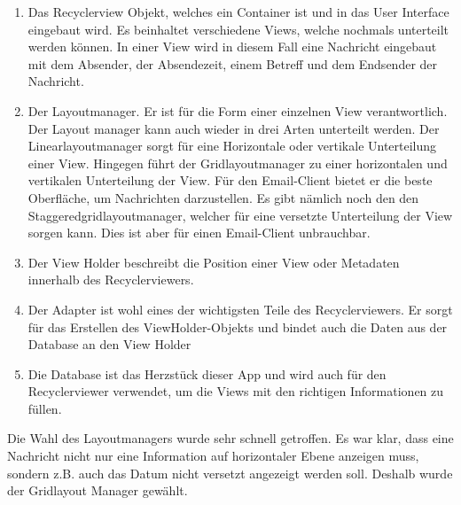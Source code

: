 \documentclass[a4paper,11pt]{article}
\begin{document}
\begin{enumerate}

    \item Das Recyclerview Objekt, welches ein Container ist und in das User Interface eingebaut wird. 
Es beinhaltet verschiedene Views, welche nochmals unterteilt werden können. In einer View wird in diesem 
Fall eine Nachricht eingebaut mit dem Absender, der Absendezeit, einem Betreff und dem Endsender der Nachricht. 

\end{enumerate}

\begin{enumerate}

    \setcounter{enumi}{1}
    \item Der Layoutmanager. Er ist für die Form einer einzelnen View verantwortlich. 
Der Layout manager kann auch wieder in drei Arten unterteilt werden. Der Linearlayoutmanager sorgt für eine 
Horizontale oder vertikale Unterteilung einer View. Hingegen führt der Gridlayoutmanager zu einer horizontalen 
und vertikalen Unterteilung der View. Für den Email-Client bietet er die  
beste Oberfläche, um Nachrichten darzustellen. Es gibt nämlich noch den den Staggeredgridlayoutmanager, welcher 
für eine versetzte Unterteilung der View sorgen kann. Dies ist aber für einen Email-Client unbrauchbar. 


    \item Der View Holder beschreibt die Position einer View oder Metadaten innerhalb des Recyclerviewers.

    \item Der Adapter ist wohl eines der wichtigsten Teile des Recyclerviewers. Er sorgt für das Erstellen des ViewHolder-Objekts und
bindet auch die Daten aus der Database an den View Holder

    \item Die Database ist das Herzstück dieser App und wird auch für den Recyclerviewer verwendet, um die 
        Views mit den richtigen Informationen zu füllen. \cite{RecViewQue} \cite{RecViewQue2}

\end{enumerate}

Die Wahl des Layoutmanagers wurde sehr schnell getroffen. Es war klar, dass eine Nachricht nicht nur eine Information auf horizontaler Ebene anzeigen muss, sondern
z.B. auch das Datum nicht versetzt angezeigt werden soll. Deshalb wurde der Gridlayout Manager gewählt. \\
\end{document}
